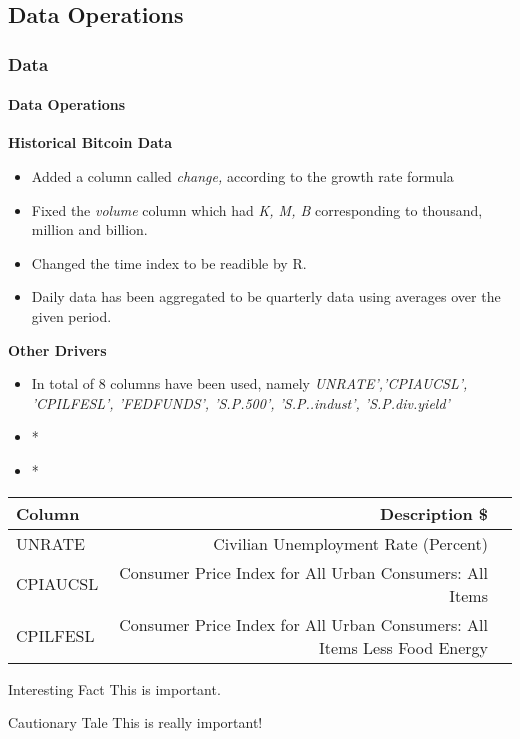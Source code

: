 \documentclass{beamer}
\begin{document}
	\subsection{Data Operations}	
	\begin{frame}
	\frametitle{Data}
		\framesubtitle{Data Operations}
					\textbf{Historical Bitcoin Data}
					\begin{itemize}
						\item Added a column called \emph{change,} according to the growth rate formula
						\item Fixed the \emph{volume} column which had \emph{K, M, B} corresponding to thousand, million and billion.
						\item Changed the time index to be readible by R.
						\item Daily data has been aggregated to be quarterly data using averages over the given period.
					\end{itemize}
	\end{frame}
	\begin{frame}
		\textbf{Other Drivers}
			\begin{itemize}
			\item In total of 8 columns have been used, namely \emph{UNRATE','CPIAUCSL', 'CPILFESL', 'FEDFUNDS', 'S.P.500', 'S.P..indust', 'S.P.div.yield'}
			\item *
			\item *
		\end{itemize}
		\begin{tabular}{|l|r|r|} \hline
			Column & Description \$ \\\hline
			UNRATE & Civilian Unemployment Rate (Percent) \\
			CPIAUCSL & Consumer Price Index for All Urban Consumers: All Items \\
			CPILFESL & Consumer Price Index for All Urban Consumers: All Items Less Food Energy \\\hline
		\end{tabular}		
	\end{frame}
	\begin{frame}
		\begin{block}{Interesting Fact}
			This is important.
		\end{block}
		\begin{alertblock}{Cautionary Tale}
			This is really important!
		\end{alertblock}
	\end{frame}
	
\end{document}
